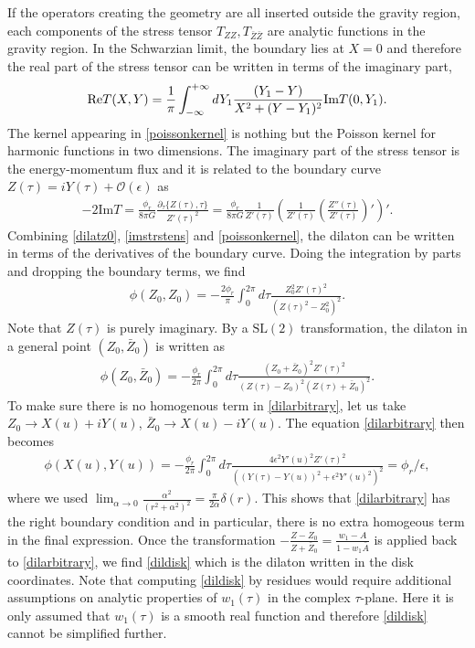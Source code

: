 \documentclass[11pt,oneside,letterpaper]{article}
\newcommand{\f}{\frac}
\let\f=\frac
\let\pa=\partial
\def\ba{\begin{eqnarray}}
\def\ea{\end{eqnarray}}
\numberwithin{equation}{section}
\def\ba{\begin{eqnarray}}
\def\ea{\end{eqnarray}}
\def\f {\frac}
\begin{document}
\begin{spacing}{1.1}
If the operators creating the geometry are all inserted outside the gravity region, each components of the stress tensor $T_{ZZ}, T_{\bar{Z} \bar{Z}}$ are analytic functions in the gravity region. In the Schwarzian limit, the boundary lies at $X=0$ and therefore the  real part of the stress tensor can be written in terms of the imaginary part,
\ba\label{poissonkernel}
{\rm Re} T( X,Y) = \frac{1}{\pi} \int_{-\infty}^{+\infty} dY_1 \f{(Y_1 - Y)}{X^2 + (Y-Y_1)^2} \text{Im}T (0, Y_1).
\ea
 The kernel appearing in \eqref{poissonkernel} is nothing but the Poisson kernel for harmonic functions in two dimensions. The imaginary part of the stress tensor is the energy-momentum flux and it is related to the boundary curve $Z(\tau)=  i Y(\tau)+ \mathcal{O}(\epsilon)$ as
\ba\label{imstrstens}
-2\text{Im} T = \f{\phi_r}{8 \pi G}\f{\pa_\tau \{ Z(\tau), \tau\}}{ Z'(\tau)^2} = \f{\phi_r}{8 \pi G} \f{1}{Z'(\tau)}\left( \f{1}{Z'(\tau)} \left( \f{Z''(\tau)}{Z'(\tau)} \right)' \right)'.
\ea 
 Combining \eqref{dilatz0}, \eqref{imstrstens} and \eqref{poissonkernel}, the dilaton can be written in terms of the derivatives of the boundary curve. Doing the integration by parts and dropping the boundary terms, we find 
\ba\label{finaldil}
\phi(Z_0,Z_0) = - \frac{2\phi_r}{\pi} \int_{0}^{2\pi} d\tau \f{Z_0^2 Z'(\tau)^2}{(Z(\tau)^2- Z_0^2)^2}.
\ea
Note that $Z(\tau)$ is purely imaginary. By a $\text{SL}(2)$ transformation, the dilaton in a general point $(Z_0, \bar{Z}_0)$ is written as
\ba\label{dilarbitrary}
\phi(Z_0, \bar{Z}_0) = - \f{\phi_r}{2\pi } \int_{0}^{2\pi} d\tau \f{(Z_0+ \bar{Z}_0)^2 Z'(\tau)^2}{(Z(\tau) - Z_0)^2 (Z(\tau)+ \bar{Z}_0)^2}.
\ea
To make sure there is no homogenous term in \eqref{dilarbitrary}, let us take $Z_0 \to X(u) + i Y(u)$, $\bar{Z}_0 \to X(u) - i Y(u)$. The equation \eqref{dilarbitrary} then becomes
\ba
\phi(X(u), Y(u)) = - \f{\phi_r}{2\pi} \int_{0}^{2\pi} d\tau \f{4 \epsilon^2 Y'(u)^2 Z'(\tau)^2}{ ((Y(\tau) - Y(u))^2 + \epsilon^2 Y'(u)^2)^2} = \phi_r/\epsilon,
\ea
where we used $\lim_{\alpha \to 0} \f{\alpha^2}{(r^2+ \alpha^2)^2} = \f{\pi}{2 \alpha} \delta (r)$. This shows that \eqref{dilarbitrary} has the right boundary condition and in particular, there is no extra homogeous term in the final expression. Once the transformation $ - \frac{Z-Z_0}{Z+\bar{Z}_0} = \frac{w_1-A}{1- w_1\bar{A}}$ is applied back to \eqref{dilarbitrary}, we find \eqref{dildisk} which is the dilaton written in the disk coordinates. Note that computing \eqref{dildisk} by residues would require additional assumptions on analytic properties of $w_1(\tau)$ in the complex $\tau$-plane. Here it is only assumed that $w_1(\tau)$ is a smooth real function and therefore \eqref{dildisk} cannot be simplified further.



\end{spacing}
\end{document}
